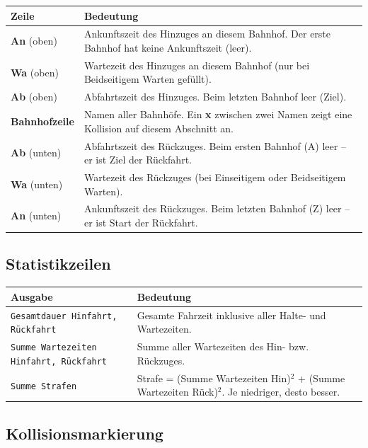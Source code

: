 \documentclass[12pt,a4paper]{article}
\begin{document}
\begin{center}
\begin{tabular}{lp{9.5cm}}
\toprule
\textbf{Zeile} & \textbf{Bedeutung} \\
\midrule
\textbf{An} (oben) & Ankunftszeit des Hinzuges an diesem Bahnhof. Der erste Bahnhof hat keine Ankunftszeit (leer). \\
\textbf{Wa} (oben) & Wartezeit des Hinzuges an diesem Bahnhof (nur bei Beidseitigem Warten gefüllt). \\
\textbf{Ab} (oben) & Abfahrtszeit des Hinzuges. Beim letzten Bahnhof leer (Ziel). \\
\textbf{Bahnhofzeile} & Namen aller Bahnhöfe. Ein \textbf{x} zwischen zwei Namen zeigt eine Kollision auf diesem Abschnitt an. \\
\textbf{Ab} (unten) & Abfahrtszeit des Rückzuges. Beim ersten Bahnhof (A) leer -- er ist Ziel der Rückfahrt. \\
\textbf{Wa} (unten) & Wartezeit des Rückzuges (bei Einseitigem oder Beidseitigem Warten). \\
\textbf{An} (unten) & Ankunftszeit des Rückzuges. Beim letzten Bahnhof (Z) leer -- er ist Start der Rückfahrt. \\
\bottomrule
\end{tabular}
\end{center}

\subsection{Statistikzeilen}

\begin{center}
\begin{tabular}{lp{8.5cm}}
\toprule
\textbf{Ausgabe} & \textbf{Bedeutung} \\
\midrule
\texttt{Gesamtdauer Hinfahrt, Rückfahrt} & Gesamte Fahrzeit inklusive aller Halte- und Wartezeiten. \\
\texttt{Summe Wartezeiten Hinfahrt, Rückfahrt} & Summe aller Wartezeiten des Hin- bzw. Rückzuges. \\
\texttt{Summe Strafen} & Strafe = (Summe Wartezeiten Hin)$^2$ + (Summe Wartezeiten Rück)$^2$. Je niedriger, desto besser. \\
\bottomrule
\end{tabular}
\end{center}

\subsection{Kollisionsmarkierung}
\end{document}
